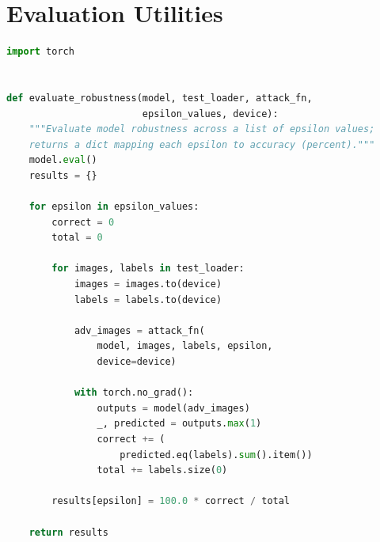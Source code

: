 \section{Evaluation Utilities}

\begin{lstlisting}[language=Python, caption={Robustness Evaluation}, label={lst:eval}]
import torch


def evaluate_robustness(model, test_loader, attack_fn,
                        epsilon_values, device):
    """Evaluate model robustness across a list of epsilon values;
    returns a dict mapping each epsilon to accuracy (percent)."""
    model.eval()
    results = {}

    for epsilon in epsilon_values:
        correct = 0
        total = 0

        for images, labels in test_loader:
            images = images.to(device)
            labels = labels.to(device)

            adv_images = attack_fn(
                model, images, labels, epsilon,
                device=device)

            with torch.no_grad():
                outputs = model(adv_images)
                _, predicted = outputs.max(1)
                correct += (
                    predicted.eq(labels).sum().item())
                total += labels.size(0)

        results[epsilon] = 100.0 * correct / total

    return results
\end{lstlisting}